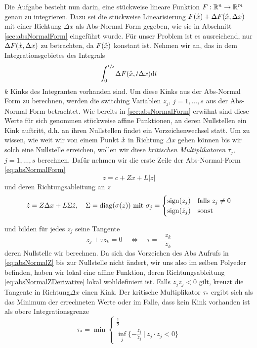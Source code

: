 Die Aufgabe besteht nun darin, eine stückweise lineare Funktion $F:\mathbb{R}^n \to \mathbb{R}^m$ genau zu integrieren. Dazu sei die stückweise Linearisierung $F(\mathring{x}) + \Delta F(\mathring{x},\Delta x)$ mit einer Richtung $\Delta x$ als Abs-Normal Form gegeben, wie sie in Abschnitt \ref{sec:absNormalForm} eingeführt wurde. 
Für unser Problem ist es ausreichend, nur $\Delta F(\mathring{x},\Delta x)$ zu betrachten, da $F(\mathring{x})$ konstant ist.
Nehmen wir an, das in dem Integrationsgebietes des Integrals
\begin{equation}
\label{eq:quadInitialProblem}
 \int_0^{\sfrac{1}{2}} \Delta F(\mathring{x},t\Delta x) \text{d}t
\end{equation}
$k$ Kinks des Integranten vorhanden sind. 
Um diese Kinks aus der Abs-Normal Form zu berechnen, werden die switching Variablen $z_j$, $j=1,\dots,s$ aus der Abs-Normal Form betrachtet. Wie bereits in \ref{sec:absNormalForm} erwähnt sind diese Werte für sich genommen stückweise affine Funktionen, an deren Nullstellen ein Kink auftritt,
d.h. an ihren Nullstellen findet ein Vorzeichenwechsel statt. Um zu wissen, wie weit wir von einem Punkt $\mathring{x}$ in Richtung $\Delta x$ gehen können bis wir solch eine Nullstelle erreichen, wollen wir diese \textit{kritischen Multiplikatoren} $\tau_j$, $j=1,\ldots, s$ berechnen. 
Dafür nehmen wir die erste Zeile der Abs-Normal-Form \eqref{eq:absNormalForm}
\begin{equation}
\label{eq:absNormalZ}
 z = c+Zx + L|z|
\end{equation}
und deren Richtungsableitung an $z$
\begin{equation}
\label{eq:absNormalZDerivative}
 \dot z = Z\Delta x + L\Sigma \dot z, \quad
 \Sigma  = \operatorname{diag}(\sigma(z)) ~ \text{mit } \sigma_j =  \begin{cases}
            \text{sign}(z_j) & \text{falls } z_j\neq 0\\
            \text{sign}(\dot z_j) &  \text{sonst}
           \end{cases}
\end{equation}

und bilden für jedes $z_j$ seine Tangente
\[
 z_j + \tau \dot z_k = 0 \quad \Leftrightarrow \quad \tau =- \frac{z_k}{\dot z_k}
\]
deren Nullstelle wir berechnen. Da sich das Vorzeichen des Abs Aufrufs in \eqref{eq:absNormalZ} bis zur Nullstelle nicht ändert, wir uns also im selben Polyeder befinden, haben wir lokal eine affine Funktion, deren Richtungsableitung \eqref{eq:absNormalZDerivative} lokal wohldefiniert ist.
Falls $z_j\dot z_j <0$ gilt, kreuzt die Tangente in Richtung$\Delta x$ einen Kink.
Der kritische Multiplikator $\tau_*$ ergibt sich als das Minimum der errechneten Werte oder im Falle, dass kein Kink vorhanden ist als obere Integrationsgrenze
\[
 \tau_* = \min \begin{cases}
		\frac{1}{2}\\
		\inf_j\lbrace -\frac{z_j}{\dot z_j}~ \vert ~ \dot z_j \cdot z_j <0 \rbrace
	       \end{cases}
\]


